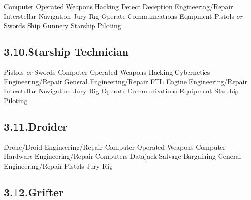 \documentclass{article}
\begin{document}
\noindent{}Computer Operated Weapons \mdbr
{}Hacking \mdbr
{}Detect Deception \mdbr
{}Engineering/Repair \mdbr
{}Interstellar Navigation \mdbr
{}Jury Rig
Operate Communications Equipment \mdbr
{}Pistols \emph{or} Swords \mdbr
{}Ship Gunnery \mdbr
{}Starship Piloting  %

\subsection{3.10.\hspace*{0.5em}Starship Technician}\label{sec-starship-technician}%

\noindent{}Pistols \emph{or} Swords \mdbr
{}Computer Operated Weapons\mdbr
{}Hacking \mdbr
{}Cybernetics Engineering/Repair \mdbr
{}General Engineering/Repair   \mdbr
{}FTL Engine Engineering/Repair\mdbr
{}Interstellar Navigation \mdbr
{}Jury Rig \mdbr
{}Operate Communications Equipment \mdbr
{}Starship Piloting %

\subsection{3.11.\hspace*{0.5em}Droider}\label{sec-droider}%

\noindent{}Drone/Droid Engineering/Repair\mdbr
{}Computer Operated Weapons\mdbr
{}Computer Hardware Engineering/Repair\mdbr
{}Computers\mdbr
{}Datajack\mdbr
{}Salvage\mdbr
{}Bargaining\mdbr
{}General Engineering/Repair\mdbr
{}Pistols\mdbr
{}Jury Rig %

\subsection{3.12.\hspace*{0.5em}Grifter}\label{sec-grifter}%
\end{document}
